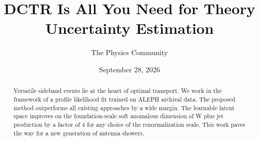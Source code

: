 \documentclass[11pt]{article}
\title{DCTR Is All You Need for Theory Uncertainty Estimation}
\author{The Physics Community}
\date{September 28, 2026}
\begin{document}
\maketitle
\begin{abstract}
Versatile sideband events lie at the heart of optimal transport. We work
in the framework of a profile likelihood fit trained on ALEPH archival
data. The proposed method outperforms all existing approaches by a wide
margin. The learnable latent space improves on the foundation-scale soft
anomalous dimension of W plus jet production by a factor of 4 for any
choice of the renormalization scale. This work paves the way for a new
generation of antenna showers.
\end{abstract}
\tableofcontents



\nocite{*}


\end{document}
